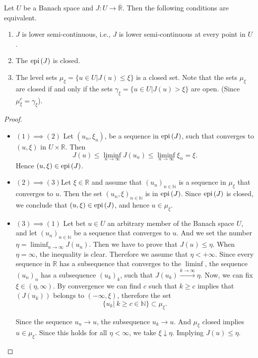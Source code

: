 \begin{theorem}
	\label{th4: levelsets and lsc}
	Let $U$ be a Banach space and $J: U\rightarrow \overline{\mathbb{R}}$. Then the following conditions are equivalent.
	\begin{enumerate}
		\item $J$ is lower semi-continuous, i.e., $J$ is lower semi-continuous at every point in $U$.
		\item The $\mathrm{epi\,}(J)$ is closed.
		\item The level sets $\mu_\xi=\lbrace u \in U | J(u)\leq \xi \rbrace$ is a closed set. Note that  the sets $\mu_\xi$ are closed if and only if the sets $\gamma_\xi=\lbrace u \in U | J(u)> \xi \rbrace $ are open. (Since $\mu_\xi ^c = \gamma _\xi$).

	\end{enumerate}
	\begin{proof}\
		
		\begin{itemize}
			\item $(1)\implies(2)$ Let $(u_n, \xi_n)$, be a sequence in $\mathrm{epi\,}(J)$, such that converges to $(u,\xi)$ in $U\times\mathbb{R}$. Then \[J(u)\leq \liminf_{n\rightarrow \infty} J(u_n) \leq \liminf_{n\rightarrow \infty}\xi_n=\xi. \]Hence $(u, \xi) \in \mathrm{epi\,} (J)$.
			
			\item $(2)\implies (3)$Let $\xi\in \mathbb{R}$ and assume that $(u_n)_{n\in \mathbb{N}}$ is a sequence in $\mu_\xi$ that converges to $u$. 
			Then the set $(u_n,\xi)_{n\in\mathbb{N}}$ is in $\mathrm{epi\,} (J)$. Since $\mathrm{epi\,} (J)$ is closed, we conclude that $(u, \xi)\in \mathrm{epi\,} (J)$, and hence $u \in \mu_\xi$.
			
			\item $(3)\implies (1)$ Let bet $u \in U$ an arbitrary member of the Banach space $U$, and let $(u_n)_{n\in \mathbb{N}}$ be a sequence that converges to $u$. And we set the number $\eta=\liminf_{n\rightarrow \infty} J(u_n)$. Then we have to prove that $J(u)\leq \eta$. When $\eta=\infty$, the inequality is clear. Therefore we assume that $\eta < +\infty$. Since every sequence in $\mathbb{R}$ has a subsequence that converges to the $\liminf$, the sequence $(u_n)_n$ has a subsequence $(u_k)_k$, such that $J(u_k) \xrightarrow{k\rightarrow\infty} \eta$. Now, we can fix $\xi \in (\eta, \infty)$. By convergence we can find $c$ such that $k\geq c$ implies that $(J(u_k))$ belongs to $(-\infty, \xi)$, therefore the set \[\lbrace u_k | \ k \geq c \in \mathbb{N}\rbrace \subset \mu_\xi. \]
			
			Since the sequence $u_n \rightarrow u$, the subsequence $u_k\rightarrow u$. And $\mu_\xi$ closed implies $u \in \mu_\xi$. Since this holds for all $\eta < \infty$, we take $\xi \downarrow \eta$. Implying $J(u)\leq \eta$. 
		\end{itemize}
	\end{proof}
\end{theorem}
